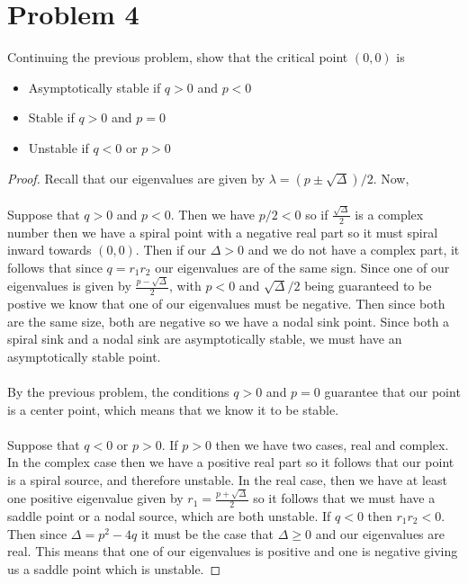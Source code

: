 \documentclass{article}
\theoremstyle{definition}
\begin{document}
\section*{Problem 4}
    \begin{mdframed}[]
        Continuing the previous problem, show that the critical point $(0,0)$ is 
        \begin{itemize}
            \item Asymptotically stable if $q > 0$ and $p < 0$ \\
            \item Stable if $q > 0$ and $p = 0$ \\
            \item Unstable if $q < 0$ or $p > 0$
        \end{itemize}
    \end{mdframed}
    \begin{proof}
        Recall that our eigenvalues are given by $\lambda = (p \pm \sqrt{\Delta})/2$. Now, \\\\
        Suppose that $q > 0$ and $p < 0$. Then we have $p / 2 < 0$ so if $\frac{\sqrt{\Delta}}{2}$ is a complex number then we have a spiral point 
        with a negative real part so it must spiral inward towards $(0,0)$. Then if our $\Delta > 0$ and we do not have a complex part, it follows that 
        since $q = r_1 r_2$ our eigenvalues are of the same sign. Since one of our eigenvalues is given by $\frac{p - \sqrt{\Delta}}{2}$, with $p < 0$ and 
        $\sqrt{\Delta} / 2$ being guaranteed to be postive we know that one of our eigenvalues must be negative. Then since both are the same size, both are negative 
        so we have a nodal sink point. Since both a spiral sink and a nodal sink are asymptotically stable, we must have an asymptotically stable point. \\\\
        By the previous problem, the conditions $q > 0$ and $p = 0$ guarantee that our point is a center point, which means that we know it to be stable. \\\\
        Suppose that $q < 0$ or $p > 0$. If $p > 0$ then we have two cases, real and complex. In the complex case then we have a positive real part so it follows 
        that our point is a spiral source, and therefore unstable. In the real case, then we have at least one positive eigenvalue given by $r_1 = \frac{p + \sqrt{\Delta}}{2}$ 
        so it follows that we must have a saddle point or a nodal source, which are both unstable. If $q < 0$ then $r_1 r_2 < 0$. Then since $\Delta = p^2 - 4q$ it must be 
        the case that $\Delta \geq 0$ and our eigenvalues are real. This means 
        that one of our eigenvalues is positive and one is negative giving us a saddle point which is unstable. 
    \end{proof}
\end{document}

